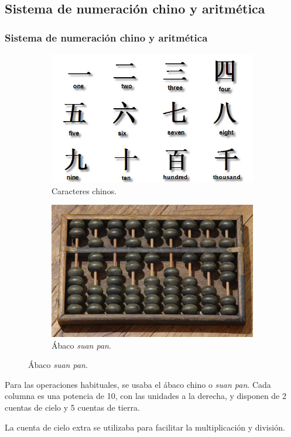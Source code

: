 \documentclass[12pt, aspectratio=169]{beamer} %
\begin{document}
	\subsection{Sistema de numeración chino y aritmética}
		\begin{frame}
			\frametitle{Sistema de numeración chino y aritmética}
			
			
			\begin{figure}
			\centering
				\begin{subfigure}{.5\textwidth}
					\centering
					\includegraphics[width = .5\linewidth]{chinese_numbers.jpg}
					\caption{Caracteres chinos.}
				\end{subfigure}%
				\pause
				\begin{subfigure}{.5\textwidth}
					\centering
					\includegraphics[width = .5\linewidth]{Chinese-abacus.jpg}
					\caption{Ábaco \textit{suan pan}.}
				\end{subfigure}
			\end{figure}
			
			Para las operaciones habituales, se usaba el ábaco chino o \textit{suan pan}. Cada columna es una
			potencia de 10, con las unidades a la derecha, y disponen de 2 cuentas de cielo y 5 cuentas de tierra.
			
			\pause
			
			\alert{La cuenta de cielo extra se utilizaba para facilitar la multiplicación y división.}
			
		\end{frame}
\end{document}
